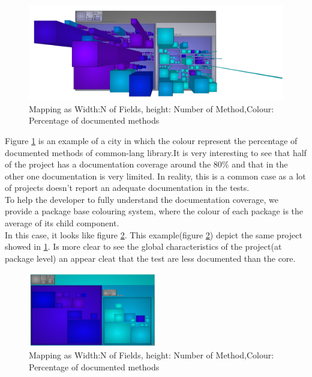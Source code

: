 \documentclass[]{usiinfbachelorproject}
\begin{document}
\begin{figure}[H]
	\centering
	\includegraphics[width=1\textwidth]{images/javaDoc}
	
	\caption[Java Documentation Mapping]{Mapping as Width:N of Fields, height: Number of Method,Colour: Percentage of documented methods\label{fig:javaDoc}}

\end{figure}

Figure \ref{fig:javaDoc} is an example of a city in which the colour represent the percentage of documented methods of common-lang library.It is very interesting to see that half of the project has a documentation coverage around the 80\% and that in the other one documentation is very limited. In reality, this is a common case as a lot of projects doesn't report an adequate documentation in the tests.\\
To help the developer to fully understand the documentation coverage, we provide a  package base colouring system, where the colour of each package is the average of its child component. \\
In this case, it looks like figure \ref{fig:OnlyPackage}.
This example(figure \ref{fig:OnlyPackage}) depict  the same project showed in \ref{fig:javaDoc}. Is more clear to see the global characteristics of the project(at package level) an appear cleat that the test are less documented than the core.

\begin{figure}[H]
	\centering
	\includegraphics[width=0.5\textwidth]{images/javaDocOnlyPackage}
	
	\caption[Java Documentation Mapping Only Package]{Mapping as Width:N of Fields, height: Number of Method,Colour: Percentage of documented methods\label{fig:OnlyPackage}}
\end{figure}
\end{document}
